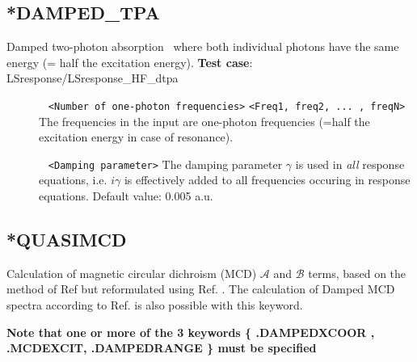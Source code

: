 \subsection{*DAMPED\_TPA}\label{subsec:dtpa}
Damped two-photon absorption~\cite{dampedtpa} where both individual photons
have the same energy (= half the excitation energy).
\newline
{\bf Test case}: LSresponse/LSresponse\_HF\_dtpa 
\begin{description}
\item[] \verb| | \newline
\verb|<Number of one-photon frequencies>|\newline
\verb|<Freq1, freq2, ... , freqN>|\newline
The frequencies in the input are one-photon frequencies (=half the
excitation energy in case of resonance).
\item[] \verb| | \newline
\verb|<Damping parameter>|\newline
The damping parameter $\gamma$ is used in \emph{all} response equations,
i.e. $i \gamma$ is effectively added to all frequencies occuring in response equations.
Default value: 0.005 a.u.
\end{description}

\subsection{*QUASIMCD}\label{subsec:quasimcd}
Calculation of magnetic circular dichroism (MCD) $\mathcal{A}$ and $\mathcal{B}$ terms, based on the method of Ref \cite{KjaergaardMCD} but reformulated using Ref. \cite{thorvaldsen:214108}. The calculation of Damped MCD spectra according to Ref. \cite{KjaergaardDampedMCD} is also possible with this keyword.

{\bf Note that one or more of the 3 keywords \{ .DAMPEDXCOOR  , .MCDEXCIT, .DAMPEDRANGE \} must be specified}

